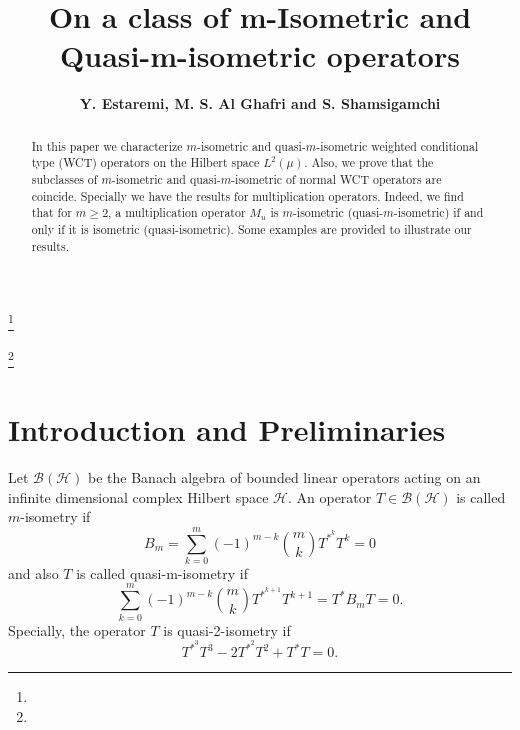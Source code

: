 \documentclass{amsart}
\theoremstyle{definition}\newtheorem{defn}[thm]{Definition}
\theoremstyle{remark}
\numberwithin{equation}{section}
\begin{document}
\title[]
{On a class of m-Isometric and Quasi-m-isometric operators}

\author{\sc\bf Y. Estaremi, M. S. Al Ghafri and S. Shamsigamchi }
\address{\sc S. Shamsigamchi}
\address{Department of Mathematics, Payame Noor(PNU) university, Tehran, Iran.}
\address{\sc Y. Estaremi}
\address{Department of Mathematics, Faculty of Sciences, Golestan University, Gorgan, Iran.}
\address{\sc M. S. Al Ghafri}
\address{Department of Mathematics, University of Technology and Applied Sciences, Rustaq {329}, Oman.}

\thanks{}

\thanks{}



\date{}

\dedicatory{}

\commby{}

\begin{abstract}
In this paper we characterize $m$-isometric and quasi-$m$-isometric weighted conditional type (WCT) operators on the Hilbert space $L^2(\mu)$. Also, we prove that the subclasses of $m$-isometric and quasi-$m$-isometric of normal WCT operators are coincide. Specially we have the results for multiplication operators. Indeed, we find that for $m\geq 2$, a multiplication operator $M_u$ is $m$-isometric (quasi-$m$-isometric) if and only if it is isometric (quasi-isometric). Some examples are provided to illustrate our results.

\end{abstract}

\maketitle

\section{ \sc\bf Introduction and Preliminaries}
Let $\mathcal{B}(\mathcal{H})$ be the Banach algebra of bounded linear operators acting on an infinite
dimensional complex Hilbert space $\mathcal{H}$. An operator $T\in \mathcal{B}(\mathcal{H})$ is called $m$-isometry if 
$$B_m=\sum_{k=0}^{m}(-1)^{m-k}\binom{m}{k}T^{*^{k}}T^{k}=0$$
and also $T$ is called quasi-m-isometry if
 $$\sum_{k=0}^{m}(-1)^{m-k}\binom{m}{k}T^{*^{k+1}}T^{k+1}=T^*B_mT=0.$$ 
 Specially, the operator $T$ is quasi-2-isometry if 
$$T^{*^3}T^3-2T^{*^2}T^2+T^*T=0.$$
\end{document}
